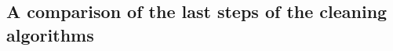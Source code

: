 \begin{table}
    \centering
    \caption{The metrics used for this works analysis as well as their calculation. Right: Confusion
    matrix for a binary (positive/negative) classification.}
    \label{tab:metrics}
    \begin{subtable}{0.48\textwidth}
        \centering
    \end{subtable}%
    \begin{subtable}{0.48\textwidth}
        \centering
    \end{subtable}%
\end{table}

\subsection{A comparison of the last steps of the cleaning algorithms}
\label{ap:comparing_last_steps}

